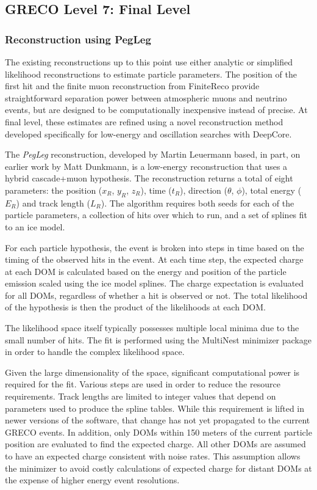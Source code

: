 \graphicspath{{chapters/greco/images/level7/}}
\subsection{GRECO Level 7: Final Level}

\label{subsec:pegleg_reco}
\subsubsection{Reconstruction using PegLeg}
The existing reconstructions up to this point use either analytic or simplified likelihood reconstructions to estimate particle parameters.
The position of the first hit and the finite muon reconstruction from FiniteReco provide straightforward separation power between atmospheric muons and neutrino events, but are designed to be computationally inexpensive instead of precise.
At final level, these estimates are refined using a novel reconstruction method developed specifically for low-energy and oscillation searches with DeepCore.

The \emph{PegLeg} reconstruction, developed by Martin Leuermann based, in part, on earlier work by Matt Dunkmann, is a low-energy reconstruction that uses a hybrid cascade+muon hypothesis.
The reconstruction returns a total of eight parameters: the position ($x_R$, $y_R$, $z_R$), time ($t_{R}$), direction ($\theta$, $\phi$), total energy ($E_{R}$) and track length ($L_{R}$). 
The algorithm requires both seeds for each of the particle parameters, a collection of hits over which to run, and a set of splines fit to an ice model.

For each particle hypothesis, the event is broken into steps in time based on the timing of the observed hits in the event.
At each time step, the expected charge at each DOM is calculated based on the energy and position of the particle emission scaled using the ice model splines.
The charge expectation is evaluated for all DOMs, regardless of whether a hit is observed or not.
The total likelihood of the hypothesis is then the product of the likelihoods at each DOM.

The likelihood space itself typically possesses multiple local minima due to the small number of hits.
The fit is performed using the MultiNest minimizer package  in order to handle the complex likelihood space.

Given the large dimensionality of the space, significant computational power is required for the fit.
Various steps are used in order to reduce the resource requirements.
Track lengths are limited to integer values that depend on parameters used to produce the spline tables. 
While this requirement is lifted in newer versions of the software, that change has not yet propagated to the current GRECO events.
In addition, only DOMs within 150 meters of the current particle position are evaluated to find the expected charge.
All other DOMs are assumed to have an expected charge consistent with noise rates.
This assumption allows the minimizer to avoid costly calculations of expected charge for distant DOMs at the expense of higher energy event resolutions. 

